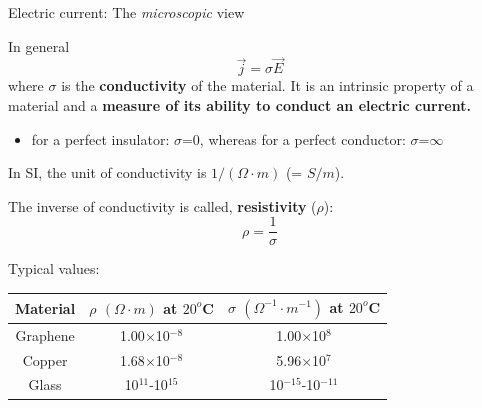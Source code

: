 \begin{frame}{Electric current: The {\em microscopic} view }

In general
\begin{equation*}
  \vec{j} = \sigma \vec{E}
\end{equation*}
where $\sigma$ is the {\bf conductivity} of the material.
It is an intrinsic property of a material and
 a {\bf measure of its ability to conduct an electric current.}
\begin{itemize}
   \item for a perfect insulator: $\sigma$=0, whereas
             for a perfect conductor: $\sigma$=$\infty$
\end{itemize}
In SI, the unit of conductivity is $1/(\Omega \cdot m)$ (= $S/m$).\\

\vspace{0.2cm}

The inverse of conductivity is called, {\bf resistivity} ($\rho$):
\begin{equation*}
  \rho = \frac{1}{\sigma}
\end{equation*}

Typical values:\\
\begin{center}
{\scriptsize
    \begin{table}
    \begin{tabular}{|c|c|c|}
      \hline
        Material &
        $\rho$  $(\Omega \cdot m)$ at $20^{o}$C &
        $\sigma$  $({\Omega}^{-1} \cdot m^{-1})$ at $20^{o}$C \\
      \hline
        Graphene &  1.00$\times$10$^{-8}$ & 1.00$\times$10$^{8}$ \\
        Copper   &  1.68$\times$10$^{-8}$ & 5.96$\times$10$^{7}$ \\
        Glass    &  10$^{11}$-10$^{15}$ & 10$^{-15}$-10$^{-11}$ \\
      \hline
    \end{tabular}
    \end{table}
}
\end{center}

\end{frame}

%
%
%

